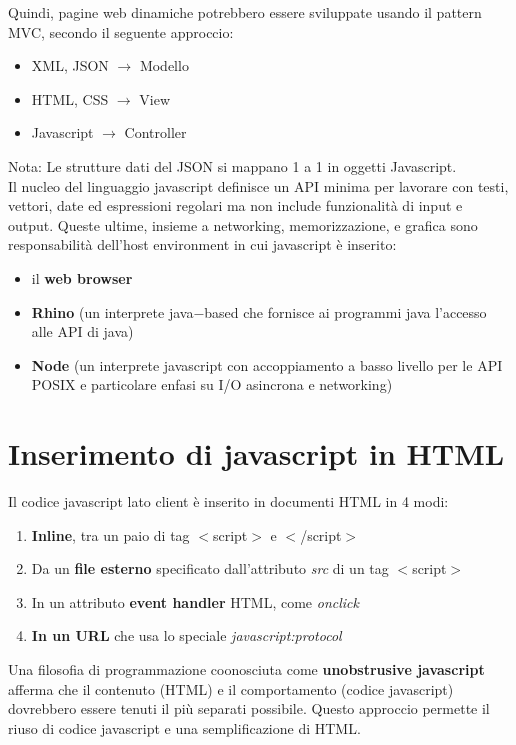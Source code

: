 Quindi, pagine web dinamiche potrebbero essere sviluppate usando il pattern MVC, secondo il seguente approccio:
\begin{itemize}
    \item XML, JSON $\rightarrow$ Modello
    \item HTML, CSS $\rightarrow$ View
    \item Javascript $\rightarrow$ Controller
\end{itemize}
Nota: Le strutture dati del JSON si mappano 1 a 1 in oggetti Javascript. \\

Il nucleo del linguaggio javascript definisce un API minima per lavorare con testi, vettori, date ed espressioni regolari ma non include funzionalità di input e output. Queste ultime, insieme a networking, memorizzazione, e grafica sono responsabilità dell'host environment in cui javascript è inserito:
\begin{itemize}
    \item il \textbf{web browser} 
    \item \textbf{Rhino} (un interprete java$-$based che fornisce ai programmi java l'accesso alle API di java)
    \item \textbf{Node} (un interprete javascript con accoppiamento a basso livello per le API POSIX e particolare enfasi su I/O asincrona e networking)
\end{itemize}

\section{Inserimento di javascript in HTML}
Il codice javascript lato client è inserito in documenti HTML in 4 modi:
\begin{enumerate}
    \item \textbf{Inline}, tra un paio di tag $<$script$>$ e $<$/script$>$
    \item Da un \textbf{file esterno} specificato dall'attributo \emph{src} di un tag $<$script$>$
    \item In un attributo \textbf{event handler} HTML, come \emph{onclick}
    \item \textbf{In un URL} che usa lo speciale \emph{javascript:protocol}
\end{enumerate}

Una filosofia di programmazione coonosciuta come \textbf{unobstrusive javascript} afferma che il contenuto (HTML) e il comportamento (codice javascript) dovrebbero essere tenuti il più separati possibile. Questo approccio permette il riuso di codice javascript e una semplificazione di HTML. 

